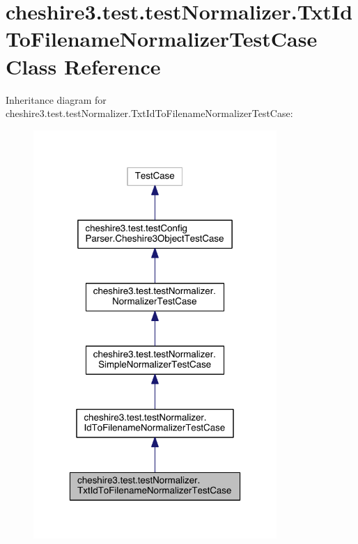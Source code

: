 \hypertarget{classcheshire3_1_1test_1_1test_normalizer_1_1_txt_id_to_filename_normalizer_test_case}{\section{cheshire3.\-test.\-test\-Normalizer.\-Txt\-Id\-To\-Filename\-Normalizer\-Test\-Case Class Reference}
\label{classcheshire3_1_1test_1_1test_normalizer_1_1_txt_id_to_filename_normalizer_test_case}
}


Inheritance diagram for cheshire3.\-test.\-test\-Normalizer.\-Txt\-Id\-To\-Filename\-Normalizer\-Test\-Case\-:
\nopagebreak
\begin{figure}[H]
\begin{center}
\leavevmode
\includegraphics[width=262pt]{classcheshire3_1_1test_1_1test_normalizer_1_1_txt_id_to_filename_normalizer_test_case__inherit__graph}
\end{center}
\end{figure}


